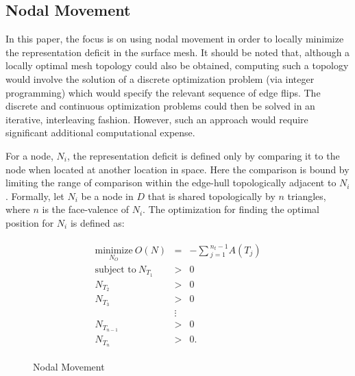 \subsection{Nodal Movement}
In this paper, the focus is on using nodal movement in 
order to locally minimize the representation deficit in the surface mesh.  
It should be noted that, although a locally optimal mesh topology could 
also be obtained, computing such a topology would involve the solution of 
a discrete optimization problem (via integer programming) which would 
specify the relevant sequence of edge flips.  The discrete 
and continuous optimization problems could then be solved in an iterative, 
interleaving fashion.  However, such an approach would require significant 
additional computational expense.

For a node, $N_i$, the representation deficit is defined only by
comparing it to the node when located at another location in space. Here
the comparison is bound by limiting the range of comparison within the
edge-hull topologically adjacent to $N_i$. Formally, let $N_i$ be a node
in $D$ that is shared topologically by $n$ triangles, where $n$ is the
face-valence of $N_i$. The optimization for finding the optimal position
for $N_i$ is defined as:

\begin{eqnarray*}
\begin{array}{rcl}
\underset{N_O}{\text{minimize}} \ O(N) & = &
-\sum{_{j=1}^{n_t-1}A\left(T_j\right)} \\
\text{subject to} \ N_{T_1} & > & 0 \\
N_{T_2} & > & 0 \\ 
N_{T_3} & > & 0 \\
& \vdots & \\
N_{T_{n-1}} & > & 0 \\ 
N_{T_n} & > & 0.
\end{array}
\end{eqnarray*}

\begin{figure}[h!]
  \caption{Nodal Movement}
\end{figure}

